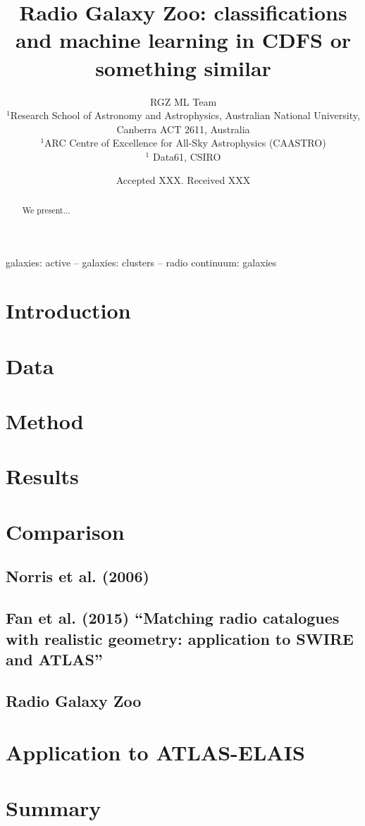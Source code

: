 \documentclass[fleqn,usenatbib,usedcolumn]{mnras}
\title[ML CDFS]{Radio Galaxy Zoo: classifications and machine learning in CDFS or something similar}
\author[RGZ ML Team]{RGZ ML Team
\\
$^{1}$Research School of Astronomy and Astrophysics, Australian National University, Canberra ACT 2611, Australia\\
$^{1}$ARC Centre of Excellence for All-Sky Astrophysics (CAASTRO)\\
$^{1}$ Data61, CSIRO\\
}
\date{Accepted XXX. Received XXX}
\begin{document}
\label{firstpage}
\pagerange{\pageref{firstpage}--\pageref{lastpage}}
\maketitle

\begin{abstract}
We present...
\end{abstract}

\begin{keywords}
galaxies: active -- galaxies: clusters -- radio continuum: galaxies
\end{keywords}

\section{Introduction}\label{sec:intro}

\section{Data}\label{sec:data}

\section{Method}

\section{Results}

\section{Comparison}
\subsection{Norris et al. (2006)}
\subsection{Fan et al. (2015) ``Matching radio catalogues with realistic geometry: application to SWIRE and ATLAS''}
\subsection{Radio Galaxy Zoo}

\section{Application to ATLAS-ELAIS}

\section{Summary}
% 





\bsp	%
\label{lastpage}
\end{document}
